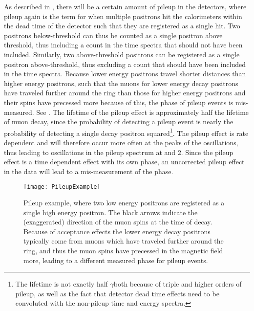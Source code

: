 As described in , there will be a certain amount of pileup in the detectors, where pileup again is the term for when multiple positrons hit the calorimeters within the dead time of the detector such that they are registered as a single hit. Two positrons below-threshold can thus be counted as a single positron above threshold, thus including a count in the time spectra that should not have been included. Similarly, two above-threshold positrons can be registered as a single positron above-threshold, thus excluding a count that should have been included in the time spectra. Because lower energy positrons travel shorter distances than higher energy positrons, such that the muons for lower energy decay positrons have traveled further around the ring than those for higher energy positrons and their spins have precessed more because of this, the \gmtwo phase of pileup events is mis-measured. See . The lifetime of the pileup effect is approximately half the lifetime of muon decay, since the probability of detecting a pileup event is nearly the probability of detecting a single decay positron squared\footnote{The lifetime is not exactly half $\gamma$\taumu both because of triple and higher orders of pileup, as well as the fact that detector dead time effects need to be convoluted with the non-pileup time and energy spectra.}. The pileup effect is rate dependent and will therefore occur more often at the peaks of the \gmtwo oscillations, thus leading to oscillations in the pileup spectrum at \wa and 2\wa. Since the pileup effect is a time dependent effect with its own phase, an uncorrected pileup effect in the data will lead to a mis-measurement of the \gmtwo phase.


\begin{figure}[]
    \centering
    \texttt{[image: PileupExample]}
    \caption[Pileup example]{Pileup example, where two low energy positrons are registered as a single high energy positron. The black arrows indicate the (exaggerated) direction of the muon spins at the time of decay. Because of acceptance effects the lower energy decay positrons typically come from muons which have traveled further around the ring, and thus the muon spins have precessed in the magnetic field more, leading to a different measured \gmtwo phase for pileup events.}
    \label{fig:PileupExample}
\end{figure}


